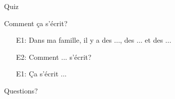\documentclass{beamer}
\begin{document}
  \begin{frame}{}
    \begin{center}
      \Large Quiz
    \end{center}
  \end{frame}

  \begin{frame}{Comment ça s'écrit? }
    \begin{itemize}
      \item[E1:] Dans ma famille, il y a des ..., des ... et des ...
      \item[E2:] Comment ... s'écrit?
      \item[E1:] Ça s'écrit ...
    \end{itemize}
  \end{frame}

  \begin{frame}{}
    \begin{center}
      \Large Questions?
    \end{center}
  \end{frame}
\end{document}

